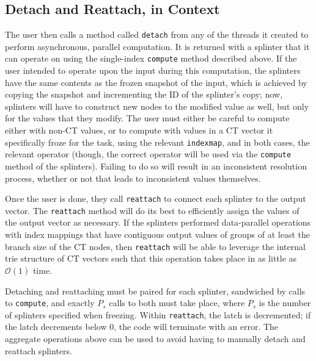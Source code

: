 \subsection{Detach and Reattach, in Context}
The user then calls a method called \texttt{detach} from any of the threads it
created to perform asynchronous, parallel computation. It is returned with a
splinter that it can operate on using the single-index \texttt{compute} method
described above. If the user intended to operate upon the input during this
computation, the  splinters have the same contents as the frozen snapshot of the
input, which is achieved by copying the snapshot and incrementing the ID of the
splinter's copy; now, splinters will have to construct new nodes to the modified
value as well, but only for the values that they modify. The user must either be
careful to compute either with non-CT values, or to compute with values in a CT
vector it specifically froze for the task, using the relevant \texttt{indexmap},
and in both cases, the relevant operator (though, the correct operator will be
used via the \texttt{compute} method of the splinters). Failing to do so will
result in an inconsistent resolution process, whether or not that leads to
inconsistent values themselves.

Once the user is done, they call \texttt{reattach} to connect each splinter to
the output vector. The \texttt{reattach} method will do its best to efficiently
assign the values of the output vector as necessary. If the splinters performed
data-parallel operations with index mappings that have contiguous output values
of groups of at least the branch size of the CT nodes, then \texttt{reattach}
will be able to leverage the internal trie structure of CT vectors such that
this operation takes place in as little as $\mathcal{O}(1)$ time.

Detaching and reattaching must be paired for each splinter, sandwiched by calls
to \texttt{compute}, and exactly $P_s$ calls to both must take place, where
$P_s$ is the number of splinters specified when freezing. Within
\texttt{reattach}, the latch is decremented; if the latch decrements below 0,
the code will terminate with an error. The aggregate operations above can be
used to avoid having to manually detach and reattach splinters.

